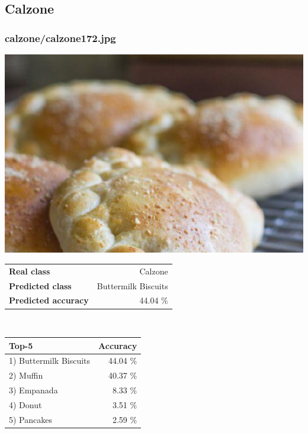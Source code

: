 \subsection{Calzone}
    
\subsubsection{calzone/calzone172.jpg}

\begin{minipage}[t]{0.4\textwidth}
	\vspace{0pt}
	\includegraphics[width=\linewidth]{images/evaluation-images/calzone/calzone172.jpg}
\end{minipage}
\hfill
\begin{minipage}[t]{0.5\textwidth}
	\vspace{0pt}\raggedright
	\begin{tabularx}{\textwidth}{X r}
		\small \textbf{Real class} & \small Calzone\\
		\small \textbf{Predicted class} & \small Buttermilk Biscuits\\
		\small \textbf{Predicted accuracy} & \small 44.04 \%
    \end{tabularx}\\
    
    \vspace{6pt}
	\begin{tabularx}{\textwidth}{X r}
        \small \textbf{Top-5} & \small \textbf{Accuracy} \\
        \hline
		\small 1) Buttermilk Biscuits & \small 44.04 \%\\\small 2) Muffin & \small 40.37 \%\\\small 3) Empanada & \small 8.33 \%\\\small 4) Donut & \small 3.51 \%\\\small 5) Pancakes & \small 2.59 \%
    \end{tabularx}
\end{minipage}
    
